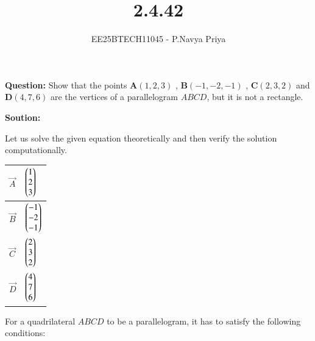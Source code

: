 \documentclass[journal,12pt,onecolumn]{IEEEtran}
\theoremstyle{remark}
\begin{document}
\title{2.4.42}
\author{EE25BTECH11045 - P.Navya Priya}
\maketitle
\renewcommand{\thefigure}{\theenumi}
\renewcommand{\thetable}{\theenumi}

\textbf{Question:}  Show that the points $\textbf{A}(1,2,3)$ , $\textbf{B}(-1,-2,-1)$ , $\textbf{C}(2,3,2)$ and $\textbf{D}(4,7,6)$ are the vertices of a parallelogram $ABCD$, but it is not a rectangle.

\vspace{0.5cm}
\textbf{Soution:}

Let us solve the given equation theoretically and then verify the solution computationally.\\
\begin{table}[H]
\centering
\renewcommand{\arraystretch}{1}
\begin{tabular}{|m{2cm}|m{2cm}|}
\hline
  $\vec{A}$   &  $\begin{pmatrix}1\\2\\3\end{pmatrix}$ \\ \hline 
  $\vec{B}$   &  $\begin{pmatrix}-1\\-2\\-1\end{pmatrix}$ \\ \hline
  $\vec{C}$   &  $\begin{pmatrix}2\\3\\2\end{pmatrix}$ \\ \hline
  $\vec{D}$   &  $\begin{pmatrix}4\\7\\6\end{pmatrix}$ \\ \hline
\end{tabular}
\end{table}

For a quadrilateral $ABCD$ to be a parallelogram, it has to satisfy the following conditions:
\end{document}
